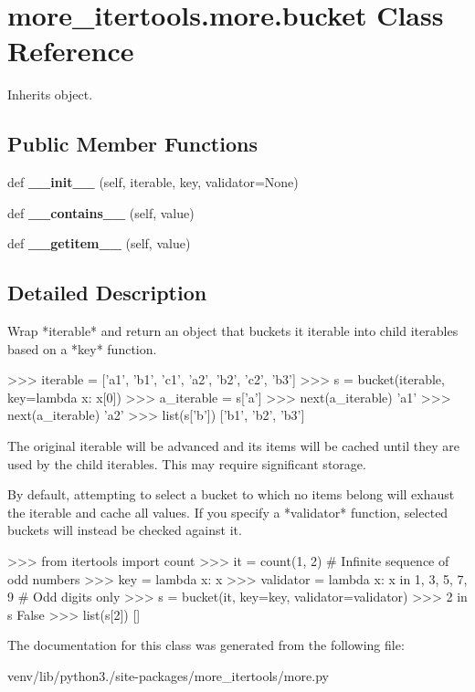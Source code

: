 \hypertarget{classmore__itertools_1_1more_1_1bucket}{}\section{more\+\_\+itertools.\+more.\+bucket Class Reference}
\label{classmore__itertools_1_1more_1_1bucket}


Inherits object.

\subsection*{Public Member Functions}
\begin{DoxyCompactItemize}
\item 
\mbox{\label{classmore__itertools_1_1more_1_1bucket_a9491a10d46def3d61c4468baa289b702}} 
def {\bfseries \+\_\+\+\_\+init\+\_\+\+\_\+} (self, iterable, key, validator=None)
\item 
\mbox{\label{classmore__itertools_1_1more_1_1bucket_a62252d64666a142c6663bb82a7a8e7e3}} 
def {\bfseries \+\_\+\+\_\+contains\+\_\+\+\_\+} (self, value)
\item 
\mbox{\label{classmore__itertools_1_1more_1_1bucket_a06b65258ccdd3b8f14c9d4e7ce6c3119}} 
def {\bfseries \+\_\+\+\_\+getitem\+\_\+\+\_\+} (self, value)
\end{DoxyCompactItemize}


\subsection{Detailed Description}
\begin{DoxyVerb}Wrap *iterable* and return an object that buckets it iterable into
child iterables based on a *key* function.

    >>> iterable = ['a1', 'b1', 'c1', 'a2', 'b2', 'c2', 'b3']
    >>> s = bucket(iterable, key=lambda x: x[0])
    >>> a_iterable = s['a']
    >>> next(a_iterable)
    'a1'
    >>> next(a_iterable)
    'a2'
    >>> list(s['b'])
    ['b1', 'b2', 'b3']

The original iterable will be advanced and its items will be cached until
they are used by the child iterables. This may require significant storage.

By default, attempting to select a bucket to which no items belong  will
exhaust the iterable and cache all values.
If you specify a *validator* function, selected buckets will instead be
checked against it.

    >>> from itertools import count
    >>> it = count(1, 2)  # Infinite sequence of odd numbers
    >>> key = lambda x: x %
    >>> validator = lambda x: x in {1, 3, 5, 7, 9}  # Odd digits only
    >>> s = bucket(it, key=key, validator=validator)
    >>> 2 in s
    False
    >>> list(s[2])
    []\end{DoxyVerb}
 

The documentation for this class was generated from the following file\+:\begin{DoxyCompactItemize}
\item 
venv/lib/python3./site-\/packages/more\+\_\+itertools/more.\+py\end{DoxyCompactItemize}
